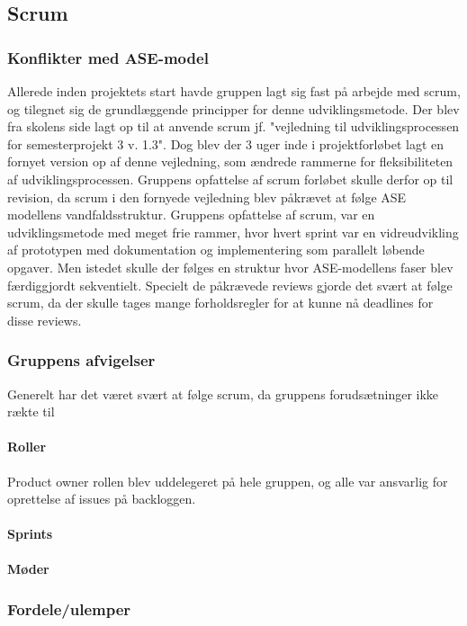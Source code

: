 \subsection{Scrum}
\subsubsection{Konflikter med ASE-model}
Allerede inden projektets start havde gruppen lagt sig fast på arbejde med scrum, og tilegnet sig de grundlæggende principper for denne udviklingsmetode.
Der blev fra skolens side lagt op til at anvende scrum jf. "vejledning til udviklingsprocessen for semesterprojekt 3 v. 1.3". Dog blev der 3 uger inde
i projektforløbet lagt en fornyet version op af denne vejledning, som ændrede rammerne for fleksibiliteten af udviklingsprocessen. Gruppens opfattelse af 
scrum forløbet skulle derfor op til revision, da scrum i den fornyede vejledning blev påkrævet at følge ASE modellens vandfaldsstruktur. Gruppens opfattelse
af scrum, var en udviklingsmetode med meget frie rammer, hvor hvert sprint var en vidreudvikling af prototypen med dokumentation og implementering som 
parallelt løbende opgaver. Men istedet skulle der følges en struktur hvor ASE-modellens faser blev færdiggjordt sekventielt. Specielt de påkrævede reviews
gjorde det svært at følge scrum, da der skulle tages mange forholdsregler for at kunne nå deadlines for disse reviews.  
 
\subsubsection{Gruppens afvigelser}
Generelt har det været svært at følge scrum, da gruppens forudsætninger ikke rækte til  
\paragraph{Roller}
Product owner rollen blev uddelegeret på hele gruppen, og alle var ansvarlig for oprettelse af issues på backloggen.   
\paragraph{Sprints}
\paragraph{Møder}


\subsubsection{Fordele/ulemper}

